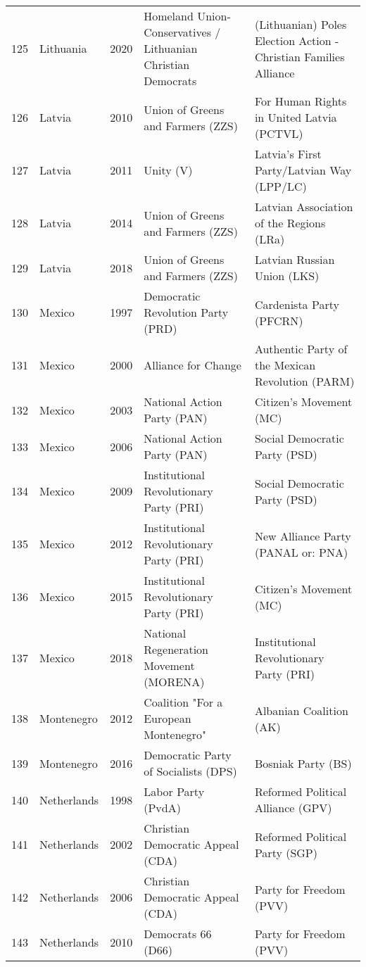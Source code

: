 \documentclass[12pt]{article}
\begin{document}
\begin{table}[ht]
\begin{footnotesize}
\begin{tabular}{rllll}
  125 & Lithuania & 2020 &   Homeland Union-Conservatives / Lithuanian Christian Democrats &   (Lithuanian) Poles Election Action - Christian Families Alliance  \\ 
  126 & Latvia & 2010 &   Union of Greens and Farmers (ZZS) &   For Human Rights in United Latvia (PCTVL) \\ 
  127 & Latvia & 2011 &   Unity (V) &   Latvia's First Party/Latvian Way (LPP/LC) \\ 
  128 & Latvia & 2014 &   Union of Greens and Farmers (ZZS) &   Latvian Association of the Regions (LRa) \\ 
  129 & Latvia & 2018 &   Union of Greens and Farmers (ZZS) &   Latvian Russian Union (LKS) \\ 
  130 & Mexico & 1997 &   Democratic Revolution Party (PRD) &   Cardenista Party (PFCRN) \\ 
  131 & Mexico & 2000 &   Alliance for Change &   Authentic Party of the Mexican Revolution (PARM) \\ 
  132 & Mexico & 2003 &   National Action Party (PAN) &   Citizen's Movement (MC) \\ 
  133 & Mexico & 2006 &   National Action Party (PAN) &   Social Democratic Party (PSD) \\ 
  134 & Mexico & 2009 &   Institutional Revolutionary Party (PRI) &   Social Democratic Party (PSD) \\ 
  135 & Mexico & 2012 &   Institutional Revolutionary Party (PRI) &   New Alliance Party (PANAL or: PNA) \\ 
  136 & Mexico & 2015 &   Institutional Revolutionary Party (PRI) &   Citizen's Movement (MC) \\ 
  137 & Mexico & 2018 &   National Regeneration Movement (MORENA) &   Institutional Revolutionary Party (PRI) \\ 
  138 & Montenegro & 2012 &   Coalition "For a European Montenegro" &   Albanian Coalition (AK) \\ 
  139 & Montenegro & 2016 &   Democratic Party of Socialists (DPS) &   Bosniak Party (BS) \\ 
  140 & Netherlands & 1998 &   Labor Party (PvdA) &   Reformed Political Alliance (GPV) \\ 
  141 & Netherlands & 2002 &   Christian Democratic Appeal (CDA) &   Reformed Political Party (SGP) \\ 
  142 & Netherlands & 2006 &   Christian Democratic Appeal (CDA) &   Party for Freedom (PVV) \\ 
  143 & Netherlands & 2010 &   Democrats 66 (D66) &   Party for Freedom (PVV) \\ 

\end{tabular}
\end{footnotesize}
\end{table}
\end{document}
